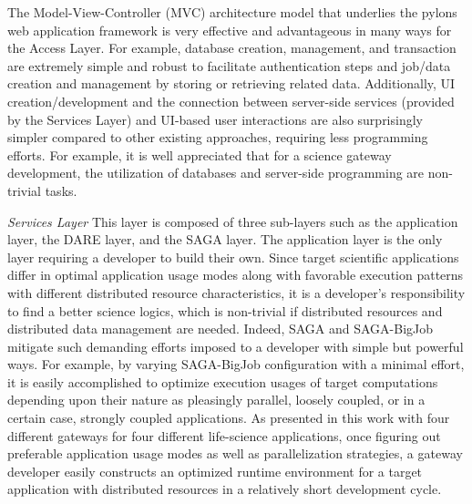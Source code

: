\documentclass{sig-alternate}
\begin{document}
The Model-View-Controller (MVC) architecture model that underlies the pylons web application framework is very effective and advantageous in many ways for the Access Layer. For example, database creation, management, and transaction are extremely simple and robust to facilitate authentication steps and job/data creation and management by storing or retrieving related data.  Additionally, UI creation/development and the connection between server-side services (provided by the Services Layer) and UI-based user interactions are also surprisingly simpler compared to other existing approaches, requiring less programming efforts.  For example, it is well appreciated that for a science gateway development, the utilization of databases and server-side programming are non-trivial tasks.         

\textit{Services Layer}
This layer is composed of three sub-layers such as the application layer, the DARE layer, and the SAGA layer.  The application layer is the only layer requiring a developer to build their own.  Since target scientific applications differ in optimal application usage modes along with favorable execution patterns with different distributed resource characteristics, it is a developer's responsibility to find a better science logics, which is non-trivial if distributed resources and distributed data management are needed.  Indeed, SAGA and SAGA-BigJob mitigate such demanding efforts imposed to a developer with simple but powerful ways.  For example, by varying SAGA-BigJob configuration with a minimal effort, it is easily accomplished to optimize execution usages of target computations depending upon their nature as pleasingly parallel, loosely coupled, or in a certain case, strongly coupled applications.  As presented in this work with four different gateways for four different life-science applications, once figuring out preferable application usage modes as well as parallelization strategies, a gateway developer easily constructs an optimized runtime environment for a target application with distributed resources in a relatively short development cycle.   


\end{document}
